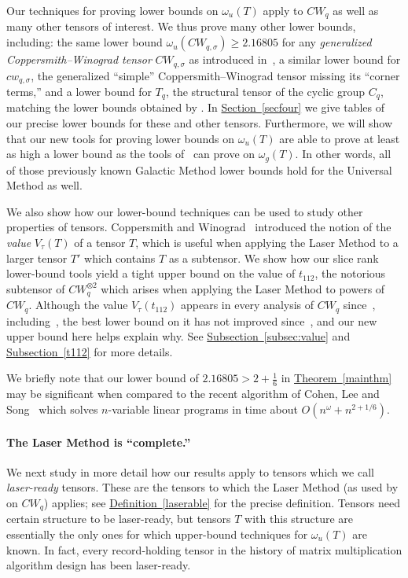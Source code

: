 \documentclass[11pt]{article}
\numberwithin{equation}{section}
\theoremstyle{definition}
\theoremstyle{plain}
\newcommand{\expref}[2]{\hyperref[#2]{#1~\ref{#2}}}
\theoremstyle{definition}
\begin{document}
Our techniques for proving lower bounds on $\omega_u(T)$  apply to $CW_q$ as well as many other tensors of interest. We thus prove many other lower bounds, including: the same lower bound $\omega_u(CW_{q,\sigma}) \geq 2.16805$ for any \emph{generalized Coppersmith--Winograd tensor} $CW_{q,\sigma}$ as introduced in~\cite{aw}, a similar lower bound for $cw_{q,\sigma}$, the generalized ``simple'' Coppersmith--Winograd tensor missing its ``corner terms,'' and a lower bound for $T_q$, the structural tensor of the cyclic group $C_q$, matching the lower bounds obtained by \cite{almanitcs, blasiak}.
In \expref{Section}{secfour} we give tables of our precise lower bounds for these and other tensors.
Furthermore, we will show that our new tools for proving lower bounds on $\omega_u(T)$ are able to prove at least as high a lower bound as the tools of~\cite{aw} can prove on $\omega_g(T)$. In other words, all of those previously known Galactic Method lower bounds hold for the Universal Method as well.

We also show how our lower-bound  %
techniques can be used to study other properties of tensors. Coppersmith and Winograd~\cite{coppersmith} introduced the notion of the \emph{value} $V_\tau(T)$ of a tensor $T$, which is useful when applying the Laser Method to a larger tensor $T'$ which contains $T$ as a subtensor. We show how our slice rank 
%
lower-bound  %
tools yield a tight upper bound on the value of $t_{112}$, the notorious subtensor of $CW_q^{\otimes 2}$ which arises when applying the Laser Method to powers of $CW_q$. Although the value $V_\tau(t_{112})$ appears in every analysis of $CW_q$ since~\cite{coppersmith},
%
including~\cite{stothers,v12,legall,awrefined,legallrect,legallrect2},
the best lower bound on it has not improved since~\cite{coppersmith}, and our new upper bound here helps explain why. See \expref{Subsection}{subsec:value} and \expref{Subsection}{t112} for more details.

We briefly note that our lower bound of $2.16805 > 2 + \frac16$ in \expref{Theorem}{mainthm} may be significant when compared to the recent algorithm of Cohen, Lee and Song~\cite{cohen2018solving} which solves $n$-variable linear programs in time about $O(n^\omega + n^{2 + 1/6})$.

%
\paragraph{The Laser Method is ``complete.''}


We next study in more detail how our results apply to tensors which we call \emph{laser-ready} tensors. These are the tensors to which the Laser Method (as used by \cite{coppersmith} on $CW_q$) applies; see \expref{Definition}{laserable} for the precise definition. Tensors need certain structure to be laser-ready, but tensors $T$ with this structure are essentially the only ones for which
%
%
upper-bound techniques for  %
 $\omega_u(T)$ are known. In fact, every record-holding tensor in the history of matrix multiplication algorithm design has been laser-ready.
\end{document}
